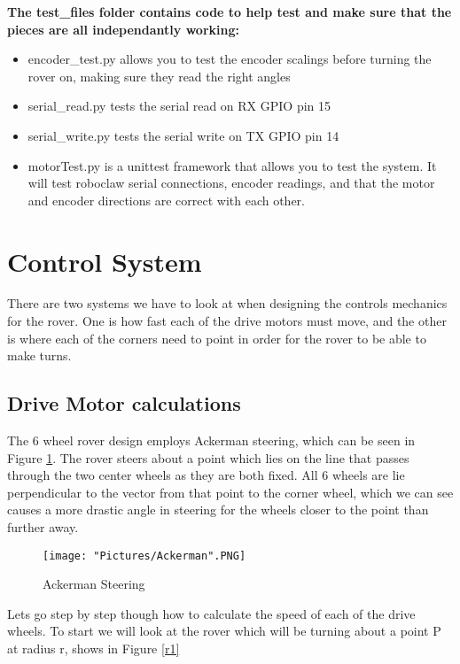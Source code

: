 \documentclass[12pt]{article}
\begin{document}
\begin{framed}
\textbf{The test\_files folder contains code to help test and make sure that the pieces are all independantly working:}
\end{framed}

\begin{itemize}
	\item encoder\_test.py allows you to test the encoder scalings before turning the rover on, making sure they read the right angles
	\item serial\_read.py tests the serial read on RX GPIO pin 15
	\item serial\_write.py tests the serial write on TX GPIO pin 14
	\item motorTest.py is a unittest framework that allows you to test the system. It will test roboclaw serial connections, encoder readings, and that the motor and encoder directions are correct with each other.
\end{itemize}



\section{Control System}

There are two systems we have to look at when designing the controls mechanics for the rover. One is how fast each of the drive motors must move, and the other is where each of the corners need to point in order for the rover to be able to make turns. 

\subsection{Drive Motor calculations}
The 6 wheel rover design employs Ackerman steering, which can be seen in Figure \ref{Ackerman}. The rover steers about a point which lies on the line that passes through the two center wheels as they are both fixed. All 6 wheels are lie perpendicular to the vector from that point to the corner wheel, which we can see causes a more drastic angle in steering for the wheels closer to the point than further away. 

\begin{figure}[H]
 	\centering
	\texttt{[image: "Pictures/Ackerman".PNG]}
 	\caption{Ackerman Steering}
	\label{Ackerman}
\end{figure}

Lets go step by step though how to calculate the speed of each of the drive wheels. To start we will look at the rover which will be turning about a point P at radius r, shows in Figure \ref{r1}
\end{document}
